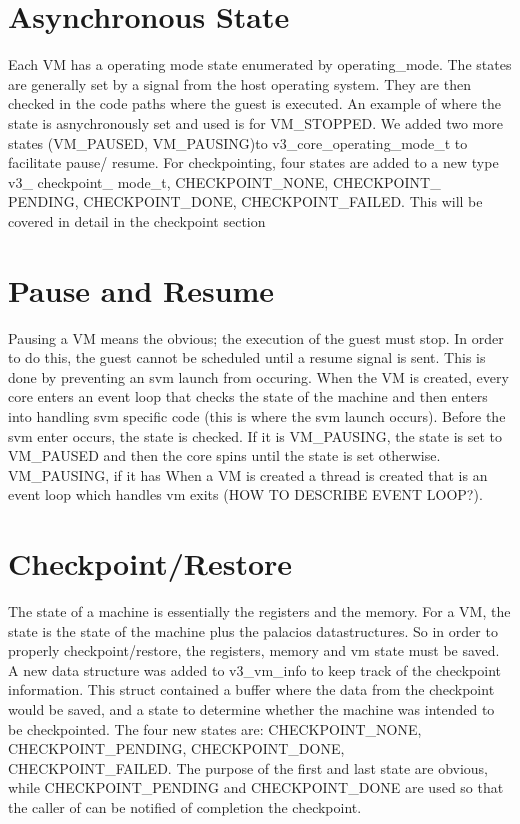 \documentclass{acm_proc_article-sp}
\begin{document}
\section{Asynchronous State}
Each VM has a operating mode state enumerated by operating\_mode. The states are generally set by a signal
from the host operating system. They are then checked in the code paths where the guest is executed.
An example of where the state is asnychronously set and used is for VM\_STOPPED.
We added two more states (VM\_PAUSED, VM\_PAUSING)to v3\_core\_operating\_mode\_t to facilitate pause/ resume.
For checkpointing, four states are added to a new type v3\_ checkpoint\_ mode\_t, CHECKPOINT\_NONE, CHECKPOINT\_ PENDING, 
CHECKPOINT\_DONE, CHECKPOINT\_FAILED. This will be covered in detail in the checkpoint section

\section{Pause and Resume}
Pausing a VM means the obvious; the execution of the guest must stop. In order to do this, the guest cannot be scheduled
until a resume signal is sent. This is done by preventing an svm launch from occuring. When the VM is created, every core 
enters an event loop that checks the state of the machine and then enters into handling svm specific code (this is where 
the svm launch occurs). Before the svm enter occurs, the state is checked. If it is VM\_PAUSING, the state is set to VM\_PAUSED
and then the core spins until the state is set otherwise.
VM\_PAUSING, if it has 
When a VM is created a thread is created that is an event loop which handles vm exits (HOW TO DESCRIBE EVENT LOOP?).

\section{Checkpoint/Restore}
The state of a machine is essentially the registers and the memory. For a VM, the state is the state of the machine
plus the palacios datastructures. So in order to properly checkpoint/restore, the registers, memory and vm state must be saved.
A new data structure was added to v3\_vm\_info to keep track of the checkpoint information. This
struct contained a buffer where the data from the checkpoint would be saved, and a state to determine whether the 
machine was intended to be checkpointed. The four new states are: CHECKPOINT\_NONE, CHECKPOINT\_PENDING, 
CHECKPOINT\_DONE, CHECKPOINT\_FAILED. The purpose of the first and last state are obvious, while CHECKPOINT\_PENDING and
CHECKPOINT\_DONE are used so that the caller of can be notified of completion the checkpoint.
\end{document}
